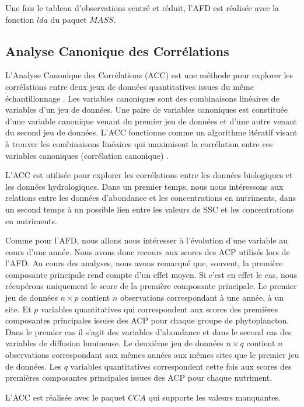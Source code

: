 \documentclass[12pt]{article}
\begin{document}
Une fois le tableau d’observations centré et réduit, l’AFD est réalisée avec la fonction $lda$ du paquet $MASS$.

\subsection{Analyse Canonique des Corrélations}

L’Analyse Canonique des Corrélations (ACC) est une méthode pour explorer les corrélations entre deux jeux de données quantitatives issues du même échantillonnage \citep{Gonzalez2008}. Les variables canoniques sont des combinaisons linéaires de variables d’un jeu de données. Une paire de variables canoniques est constituée d’une variable canonique venant du premier jeu de données et d’une autre venant du second jeu de données. L'ACC fonctionne comme un algorithme itératif visant à trouver les combinaisons linéaires qui maximisent la corrélation entre ces variables canoniques (corrélation canonique) \citep{Gonzalez2008}. 

L'ACC est utilisée pour explorer les corrélations entre les données biologiques et les données hydrologiques. Dans un premier temps, nous nous intéressons aux relations entre les données d’abondance et les concentrations en nutriments, dans un second temps à un possible lien entre les valeurs de SSC et les concentrations en nutriments.  

Comme pour l’AFD, nous allons nous intéresser à l’évolution d’une variable au cours d’une année. Nous avons donc recours aux scores des ACP utilisés lors de l’AFD. Au cours des analyses, nous avons remarqué que, souvent, la première composante principale rend compte d’un effet moyen. Si c’est en effet le cas, nous récupérons uniquement le score de la première composante principale. Le premier jeu de données $n \times p$ contient $n$ observations correspondant à une année, à un site. Et $p$ variables quantitatives qui correspondent aux scores des premières composantes principales issues des ACP pour chaque groupe de phytoplancton. Dans le premier cas il s’agit des variables d’abondance et dans le second cas des variables de diffusion lumineuse.  Le deuxième jeu de données $n \times q$ contient $n$ observations correspondant aux mêmes années aux mêmes sites que le premier jeu de données. Les $q$ variables quantitatives correspondent cette fois aux scores des premières composantes principales issues des ACP pour chaque nutriment.

L'ACC est réalisée avec le paquet $CCA$ qui supporte les valeurs manquantes. 
\end{document}
